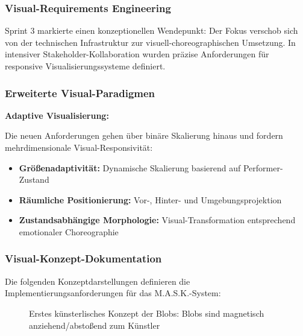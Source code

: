 \subsubsection{Visual-Requirements Engineering}

Sprint 3 markierte einen konzeptionellen Wendepunkt: Der Fokus verschob sich von der technischen Infrastruktur zur visuell-choreographischen Umsetzung. In intensiver Stakeholder-Kollaboration wurden präzise Anforderungen für responsive Visualisierungssysteme definiert.

\subsubsection{Erweiterte Visual-Paradigmen}

\textbf{Adaptive Visualisierung:}
\raggedright Die neuen Anforderungen gehen über binäre Skalierung hinaus und fordern mehrdimensionale Visual-Responsivität:
\begin{itemize}
    \item \textbf{Größenadaptivität:} Dynamische Skalierung basierend auf Performer-Zustand
    \item \textbf{Räumliche Positionierung:} Vor-, Hinter- und Umgebungsprojektion
    \item \textbf{Zustandsabhängige Morphologie:} Visual-Transformation entsprechend emotionaler Choreographie
\end{itemize}

\subsubsection{Visual-Konzept-Dokumentation}

Die folgenden Konzeptdarstellungen definieren die Implementierungsanforderungen für das M.A.S.K.-System:

\begin{figure}[htbp]
    \centering
    \caption{Erstes künsterlisches Konzept der Blobs: Blobs sind magnetisch anziehend/abstoßend zum Künstler}
    \label{fig:scaling_concept}
\end{figure}

